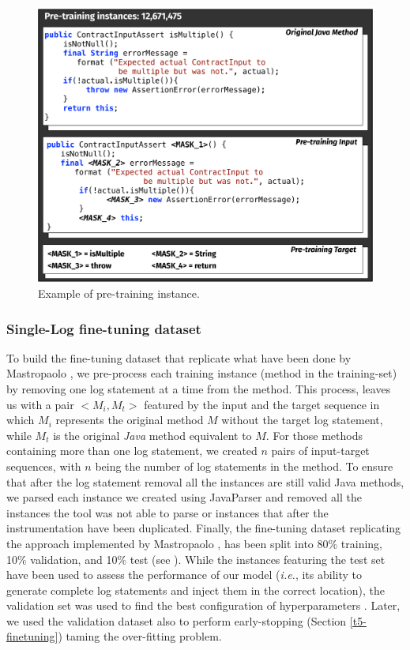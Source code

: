\begin{figure}[h!]
	\caption{Example of pre-training instance.}
	\label{pre-training}
	\includegraphics[width=\columnwidth]{img/pre-training.pdf}
\end{figure}




\subsubsection{Single-Log fine-tuning dataset}
To build the fine-tuning dataset that replicate what have been done by Mastropaolo \etal \cite{mastropaolo2022using}, we pre-process each training instance (\ie \java method in the training-set) by removing one log statement at a time from the \java method. This process, leaves us with a pair $<M_i, M_t>$ featured by the input and the target sequence in which $M_i$ represents the original \java method $M$ without the target log statement, while $M_t$ is the original \emph{Java} method equivalent to $M$. For those methods containing more than one log statement, we created $n$ pairs of input-target sequences, with $n$ being the number of log statements in the method. To ensure that after the log statement removal all the instances are still valid Java methods, we parsed each instance we created using JavaParser \cite{} and removed all the instances the tool was not able to parse or instances that after the instrumentation have been duplicated. Finally, the fine-tuning dataset replicating the approach implemented by Mastropaolo \etal \cite{mastropaolo2022using}, has been split into 80\% training, 10\% validation, and 10\% test (see ). 
While the instances featuring the test set have been used to assess the performance of our model (\emph{i.e.}, its ability to generate complete log statements and inject them in the correct location), the validation set was used to find the best configuration of hyperparameters . Later, we used the validation dataset also to perform early-stopping (Section \ref{t5-finetuning}) taming the over-fitting problem.

